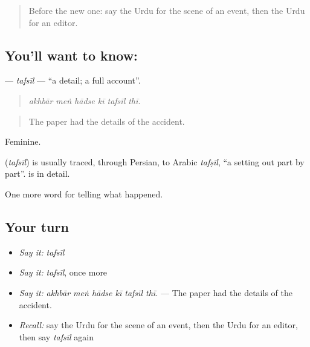 \label{lesson:UR-C301-tafsil}



\begin{quote}
Before the new one: say the Urdu for the scene of an event, then the Urdu for an editor.
\end{quote}

\subsection*{You'll want to know: }
\textbf{} — \emph{tafsīl} — \textquotedblleft{}a detail; a full account\textquotedblright{}.

\begin{quote}
     
\end{quote}

\begin{quote}
\emph{akhbār meṅ hādse kī tafsīl thī.}
\end{quote}

\begin{quote}
The paper had the details of the accident.
\end{quote}

Feminine.

\begin{cousinweb}
\textbf{} (\emph{tafsīl}) is usually traced, through Persian, to Arabic \emph{tafṣīl}, \textquotedblleft{}a setting out part by part\textquotedblright{}. \textbf{ } is in detail.
\end{cousinweb}

\begin{grammarlens}[title={What you've built}]
One more word for telling what happened.
\end{grammarlens}

\subsection*{Your turn}
\begin{itemize}
\raggedright
  \item \emph{Say it:} \emph{tafsīl}
  \item \emph{Say it:} \emph{tafsīl}, once more
  \item \emph{Say it:} \emph{akhbār meṅ hādse kī tafsīl thī.} — The paper had the details of the accident.
  \item \emph{Recall:} say the Urdu for the scene of an event, then the Urdu for an editor, then say \emph{tafsīl} again
\end{itemize}

